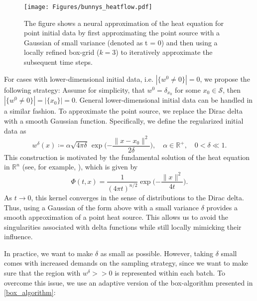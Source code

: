 \documentclass[12pt,openany]{book}
\def\S{\mathcal{S}}
\theoremstyle{plainnormal}
\theoremstyle{remark}
\begin{document}
\begin{figure}
    
    \texttt{[image: Figures/bunnys\_heatflow.pdf]}
    
\caption{The figure shows a neural approximation of the heat equation for point initial data by first approximating the point source with a Gaussian of small variance (denoted as t = 0) and then using a locally refined box-grid ($k=3$) to iteratively approximate the subsequent time steps.} \label{point_bunny}
\end{figure}
For cases with lower-dimensional initial data, i.e. $|\{w^0 \neq0\}| = 0$, we propose the following strategy:
Assume for simplicity, that $w^0 = \delta_{x_0}$ for some $x_0\in\S$, then $|\{w^0 \neq0\}| = |\{x_0\}| = 0$. General lower-dimensional initial data can be handled in a similar fashion. To approximate the point source, we replace the Dirac delta with a smooth Gaussian function. Specifically, we define the regularized initial data as
\[
w^{\delta}(x) \coloneqq \alpha \sqrt{4\pi\delta} \, \exp\Bigg({-\frac{\|x - x_0\|^2}{2\delta}}\Bigg), \quad \alpha \in \mathbb{R}^+, \quad 0 < \delta \ll 1.
\]
This construction is motivated by the fundamental solution of the heat equation in \( \mathbb{R}^n \) (see, for example, \cite{evans2}), which is given by
\[
\Phi(t, x) = \frac{1}{(4\pi t)^{n/2}} \exp\Big({-\frac{\|x\|^2}{4t}}\Big).
\]
As \( t \to 0 \), this kernel converges in the sense of distributions to the Dirac delta. Thus, using a Gaussian of the form above with a small variance \( \delta \) provides a smooth approximation of a point heat source. This allows us to avoid the singularities associated with delta functions while still locally mimicking their influence.\par
In practice, we want to make $\delta$ as small as possible. However, taking $\delta$ small comes with increased demands on the sampling strategy, since we want to make sure that the region with $w^\delta >> 0$ is represented within each batch. To overcome this issue, we use an adaptive version of the box-algorithm presented in \cref{box_algorithm}: 
\end{document}
